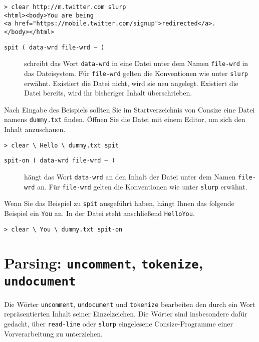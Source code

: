 \begin{verbatim}
> clear http://m.twitter.com slurp
<html><body>You are being
<a href="https://mobile.twitter.com/signup">redirected</a>.
</body></html>
\end{verbatim}

\begin{description}
\item[\texttt{spit ( data-wrd file-wrd -- )}] schreibt das Wort \verb|data-wrd| in eine Datei unter dem Namen \verb|file-wrd| in das Dateisystem. Für \verb|file-wrd| gelten die Konventionen wie unter \verb|slurp| erwähnt. Existiert die Datei nicht, wird sie neu angelegt. Existiert die Datei bereits, wird ihr bisheriger Inhalt überschrieben.
\end{description}

Nach Eingabe des Beispiels sollten Sie im Startverzeichnis von Consize eine Datei namens \verb|dummy.txt| finden. Öffnen Sie die Datei mit einem Editor, um sich den Inhalt anzuschauen.

\begin{verbatim}
> clear \ Hello \ dummy.txt spit

\end{verbatim}

\begin{description}
\item[\texttt{spit-on ( data-wrd file-wrd -- )}] hängt das Wort \verb|data-wrd| an den Inhalt der Datei unter dem Namen \verb|file-wrd| an. Für \verb|file-wrd| gelten die Konventionen wie unter \verb|slurp| erwähnt.
\end{description}

Wenn Sie das Beispiel zu \verb|spit| ausgeführt haben, hängt Ihnen das folgende Beispiel ein \verb|You| an. In der Datei steht anschließend \verb|HelloYou|.

\begin{verbatim}
> clear \ You \ dummy.txt spit-on

\end{verbatim}

\section{Parsing: \texttt{uncomment}, \texttt{tokenize}, \texttt{undocument}}
\label{Sec:Parsing}

Die Wörter \verb|uncomment|, \verb|undocument| und \verb|tokenize| bearbeiten den durch ein Wort repräsentierten Inhalt seiner Einzelzeichen. Die Wörter sind insbesondere dafür gedacht, über \verb|read-line| oder \verb|slurp| eingelesene Consize-Programme einer Vorverarbeitung zu unterziehen.

